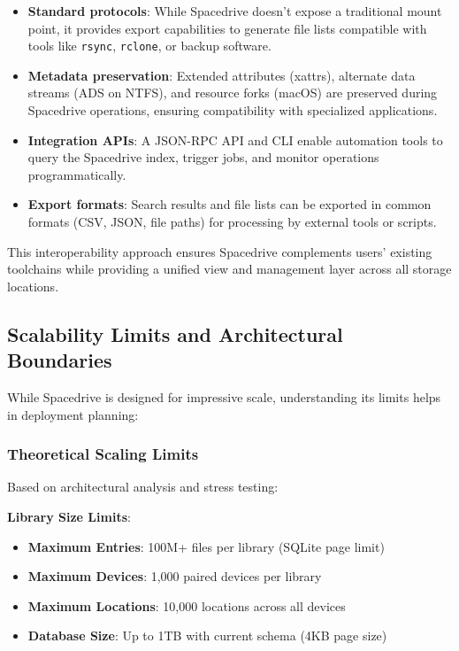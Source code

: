 \documentclass[sigconf]{acmart}
\begin{document}
\begin{itemize}[noitemsep, topsep=0pt]
 \item \textbf{Standard protocols}: While Spacedrive doesn't expose a traditional mount point, it provides export capabilities to generate file lists compatible with tools like \texttt{rsync}, \texttt{rclone}, or backup software.

 \item \textbf{Metadata preservation}: Extended attributes (xattrs), alternate data streams (ADS on NTFS), and resource forks (macOS) are preserved during Spacedrive operations, ensuring compatibility with specialized applications.

 \item \textbf{Integration APIs}: A JSON-RPC API and CLI enable automation tools to query the Spacedrive index, trigger jobs, and monitor operations programmatically.

 \item \textbf{Export formats}: Search results and file lists can be exported in common formats (CSV, JSON, file paths) for processing by external tools or scripts.
\end{itemize}

This interoperability approach ensures Spacedrive complements users' existing toolchains while providing a unified view and management layer across all storage locations.

\subsection{Scalability Limits and Architectural Boundaries}
While Spacedrive is designed for impressive scale, understanding its limits helps in deployment planning:

\subsubsection{Theoretical Scaling Limits}
Based on architectural analysis and stress testing:

\textbf{Library Size Limits}:
\begin{itemize}[noitemsep, topsep=0pt]
\item \textbf{Maximum Entries}: 100M+ files per library (SQLite page limit)
\item \textbf{Maximum Devices}: 1,000 paired devices per library
\item \textbf{Maximum Locations}: 10,000 locations across all devices
\item \textbf{Database Size}: Up to 1TB with current schema (4KB page size)
\end{itemize}
\end{document}
